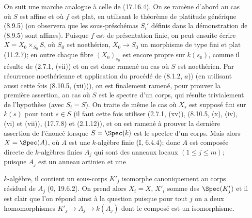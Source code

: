 On suit une marche analogue à celle de (17.16.4). On se ramène d'abord au cas où $S$ est affine et où $f$ est plat, en utilisant le théorème de platitude générique (8.9.5) (on observera que les sous-préschémas $S_i'$ définis dans la démonstration de (8.9.5) sont affines). Puisque $f$ est de présentation finie, on peut ensuite écrire $X=X_0\times_{S_0}S$, où $S_0$ est noethérien, $X_0\to S_0$ un morphisme de type fini et plat (11.2.7); en outre chaque fibre $(X_0)_{s_0}$ est encore propre sur $k(s_0)$, comme il résulte de (2.7.1, (vii)) et on est donc ramené au cas où $S$ est noethérien. Par récurrence noethérienne et application du procédé de (8.1.2, $a$)) (en utilisant aussi cette fois (8.10.5, (xii))), on est finalement ramené, pour prouver la première assertion, au cas où $S$ est le spectre d'un corps, qui résulte trivialement de l'hypothèse (avec $S_i=S$). On traite de même le cas où $X_s$ est supposé fini sur $k(s)$ pour tout $s\in S$ (il faut cette fois utiliser (2.7.1, (xv)), (8.10.5, (x), (iv), (vi) et (vii)), (17.7.8) et (2.1.12)), et on est ramené à prouver la dernière assertion de l'énoncé lorsque $S=\Spec(k)$ est le spectre d'un corps. Mais alors $X=\Spec(A)$, où $A$ est une $k$-algèbre finie (I, 6.4.4); donc $A$ est composée directe de $k$-algèbres finies $A_j$ qui sont des anneaux locaux $(1\leq j\leq m)$; puisque $A_j$ est un anneau artinien et une


$k$-algèbre, il contient un sous-corps $K'_j$ isomorphe canoniquement au corps résiduel de $A_j$ (0, 19.6.2). On prend alors $X_i=X$, $X'_i$ somme des $\Spec(K'_j)$ et il est clair que l'on répond ainsi à la question puisque pour tout $j$ on a deux homomorphismes $K'_j\to A_j\to k(A_j)$ dont le composé est un isomorphisme.
